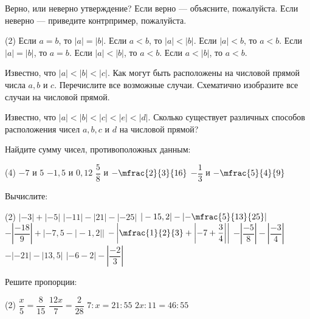 \begin{class}[number=5-6]
\begin{listofex}
		\item Верно, или неверно утверждение? Если верно --- объясните, пожалуйста. Если неверно --- приведите контрпример, пожалуйста.
		\begin{tasks}(2)
			\task Если \( a=b \), то \( |a|=|b| \).
			\task Если \( a<b \), то \( |a|<|b| \).
			\task Если \( |a|<b \), то \( a<b \).
			\task Если \( |a|=|b| \), то \( a=b \).
			\task Если \( |a|<|b| \), то \( a<b \).
			\task Если \( a<|b| \), то \( a<b \).
		\end{tasks}
		\item Известно, что \( |a|<|b|<|c| \). Как могут быть расположены на числовой прямой числа \(a, b\) и \(c\). Перечислите все возможные случаи. Схематично изобразите все случаи на числовой прямой.
		\item Известно, что \( |a|<|b|<|c|<|e|<|d| \). Сколько существует различных способов расположения чисел \(a, b, c\) и \(d\) на числовой прямой?
		
	\end{listofex}
\end{class}

\begin{homework}[number=3]
	\begin{listofex}
		\item Найдите сумму чисел, противоположных данным:
		\begin{tasks}(4)
			\task \( -7  \) и \( 5 \)
			\task \( -1,5  \) и \( 0,12 \)
			\task \( \dfrac{5}{8}  \) и \( -\mfrac{2}{3}{16} \)
			\task \( -\dfrac{1}{3}  \) и \( -\mfrac{5}{4}{9} \)
		\end{tasks}
		\item Вычислите:
		\begin{tasks}(2)
			\task \(  |-3|+|-5| \)
			\task \( |-11|-|21|-|-25|  \)
			\task \(  |-15,2|-\left|-\mfrac{5}{13}{25}\right| \)
			\task \(  -\left|\dfrac{-18}{9}\right| + |-7,5-|-1,2|| \)
			\task \(  -\left|\mfrac{1}{2}{3} + \left|-7+\dfrac{3}{4}\right|\right| \)
			\task \(  -\left|\dfrac{-5}{8}\right|-\left|\dfrac{-3}{4}\right| \)
			\task \(  -|-21|-|13,5| \)
			\task \( |-6-2| - \left|\dfrac{-2}{3}\right|  \)
		\end{tasks}
		\item Решите пропорции:
		\begin{tasks}(2)
			\task \( \dfrac{x}{5}=\dfrac{8}{15} \)
			\task \( \dfrac{12x}{7}=\dfrac{2}{28} \)
			\task \( 7:x=21:55\)
			\task \( 2x:11=46:55\)
		\end{tasks}
	\end{listofex}
\end{homework}

